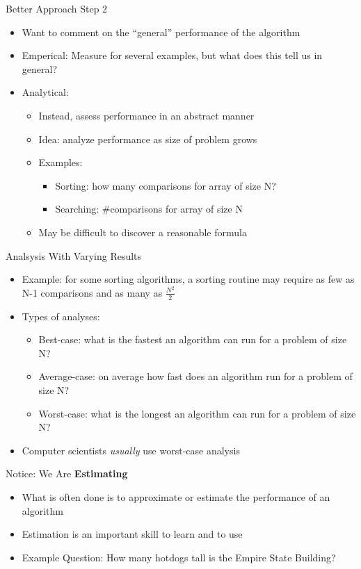 \documentclass{beamer}
\begin{document}
\begin{frame}{Better Approach Step 2}
\begin{itemize}
\item Want to comment on the ``general'' performance of the algorithm
\item Emperical: Measure for several examples, but what does this tell us in general?
\item Analytical:
\begin{itemize}
\item Instead, assess performance in an abstract manner
\item Idea: analyze performance as size of problem grows
\item Examples:
\begin{itemize}
\item Sorting: how many comparisons for array of size N?
\item Searching: \#comparisons for array of size N
\end{itemize}
\item May be difficult to discover a reasonable formula
\end{itemize}
\end{itemize}
\end{frame}

\begin{frame}{Analsysis With Varying Results}
\begin{itemize}
\item Example: for some sorting algorithms, a sorting routine may require as few as N-1 comparisons and as many as $\frac{N^2}{2}$
\item Types of analyses:
\begin{itemize}
\item Best-case: what is the fastest an algorithm can run for a problem of size N?
\item Average-case: on average how fast does an algorithm run for a problem of size N?
\item Worst-case: what is the longest an algorithm can run for a problem of size N?
\end{itemize}
\item Computer scientists \textit{usually} use worst-case analysis
\end{itemize}
\end{frame}

\begin{frame}{Notice: We Are \textbf{Estimating}}
\begin{itemize}
\item What is often done is to approximate or estimate the performance of an algorithm
\item Estimation is an important skill to learn and to use
\item Example Question: How many hotdogs tall is the Empire State Building?
\end{itemize}
\end{frame}
\end{document}
